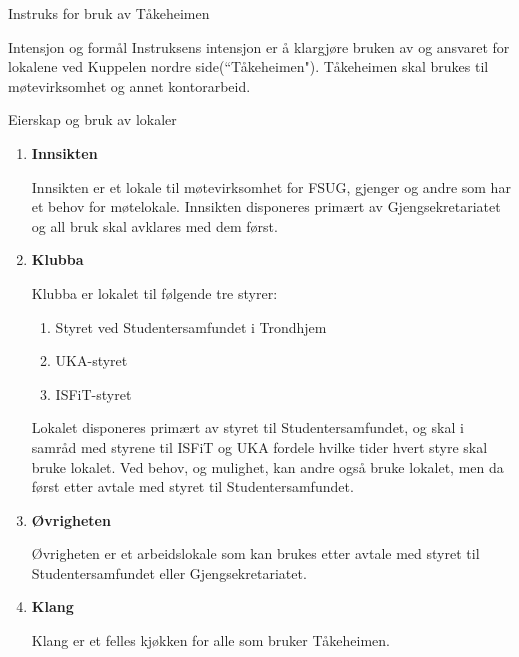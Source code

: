 \documentclass[../../fsbok.tex]{subfiles}
\begin{document}
\begin{instruks}{Instruks for bruk av Tåkeheimen}{}{}

    \begin{instruksledd}{Intensjon og formål}
Instruksens intensjon er å klargjøre bruken av og ansvaret for lokalene ved Kuppelen nordre side(\textquotedblleft Tåkeheimen"). Tåkeheimen skal brukes til møtevirksomhet og annet kontorarbeid. 

    \end{instruksledd}

    \begin{instruksledd}{Eierskap og bruk av lokaler}
        \begin{enumerate}
		\item \textbf{Innsikten}
			
Innsikten er et lokale til møtevirksomhet for FSUG, gjenger og andre som har et behov for møtelokale. Innsikten disponeres primært av Gjengsekretariatet og all bruk skal avklares med dem først.
		
\item \textbf{Klubba}
			
Klubba er lokalet til følgende tre styrer: 
			\begin{enumerate}
			\item Styret ved Studentersamfundet i Trondhjem
			\item UKA-styret
			\item ISFiT-styret
			\end{enumerate}

			 Lokalet disponeres primært av styret til Studentersamfundet, og skal i samråd med styrene til ISFiT og UKA fordele hvilke tider hvert styre skal bruke lokalet. Ved behov, og mulighet, kan andre også bruke lokalet, men da først etter avtale med styret til Studentersamfundet.
		
\item \textbf{Øvrigheten}

		Øvrigheten er et arbeidslokale som kan brukes etter avtale med styret til Studentersamfundet eller Gjengsekretariatet.

\item \textbf{Klang}

		Klang er et felles kjøkken for alle som bruker Tåkeheimen.

        \end{enumerate}
    \end{instruksledd}


\end{instruks}
\end{document}
